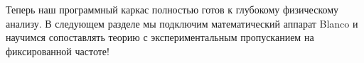 
Теперь наш программный каркас полностью готов к глубокому физическому анализу. В следующем разделе мы подключим математический аппарат Blanco и научимся сопоставлять теорию с экспериментальным пропусканием на фиксированной частоте!

